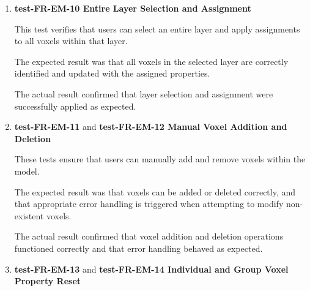 \documentclass[12pt, titlepage]{article}
\begin{document}
\begin{enumerate}

\item \textbf{test-FR-EM-10 Entire Layer Selection and Assignment}

\hspace{1.5em} This test verifies that users can select an entire layer and apply assignments to all voxels within that layer.

The expected result was that all voxels in the selected layer are correctly identified and updated with the assigned properties.

The actual result confirmed that layer selection and assignment were successfully applied as expected.


\item \textbf{test-FR-EM-11} and \textbf{test-FR-EM-12 Manual Voxel Addition and Deletion}

\hspace{1.5em} These tests ensure that users can manually add and remove voxels within the model.

The expected result was that voxels can be added or deleted correctly, and that appropriate error handling is triggered when attempting to modify non-existent voxels.

The actual result confirmed that voxel addition and deletion operations functioned correctly and that error handling behaved as expected.



\item \textbf{test-FR-EM-13} and \textbf{test-FR-EM-14 Individual and Group Voxel Property Reset}


\end{enumerate}
\end{document}

